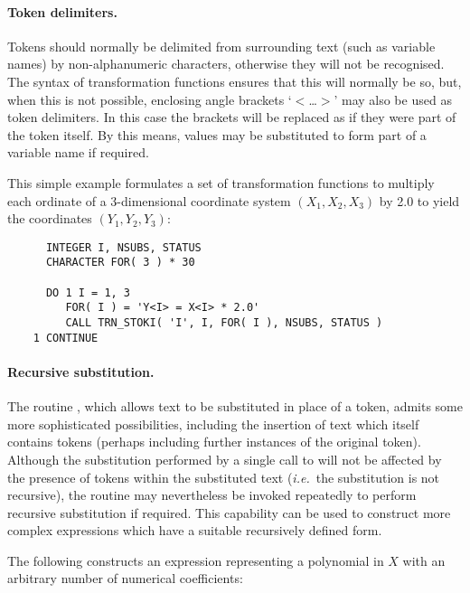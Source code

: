 \paragraph{Token delimiters.}
Tokens should normally be delimited from surrounding text (such as variable
names) by non-alphanumeric characters, otherwise they will not be 
recognised.
The syntax of transformation functions ensures that this will normally be 
so, but, when this is not possible, enclosing angle brackets `$<$\ldots $>$'
may also be used as token delimiters. 
In this case the brackets will be replaced as if they were part of the token
itself. 
By this means, values may be substituted to form part of a variable name if 
required.

This simple example formulates a set of transformation functions to multiply
each ordinate of a 3-dimensional coordinate system \mbox{$(X_1,X_2,X_3)$} by
2.0 to yield the coordinates \mbox{$(Y_1,Y_2,Y_3)$}: 

\begin{verbatim}
      INTEGER I, NSUBS, STATUS
      CHARACTER FOR( 3 ) * 30

      DO 1 I = 1, 3
         FOR( I ) = 'Y<I> = X<I> * 2.0'
         CALL TRN_STOKI( 'I', I, FOR( I ), NSUBS, STATUS )
    1 CONTINUE
\end{verbatim}
\exampledone

\paragraph{Recursive substitution.}
The routine , which allows text to be substituted in place
of a token, admits some more sophisticated possibilities, including the
insertion of text which itself contains tokens (perhaps including further
instances of the original token). 
Although the substitution performed by a single call to  
will not be affected by the presence of tokens within the substituted text 
({\em i.e.}\ the substitution is not recursive), the routine may nevertheless 
be invoked repeatedly to perform recursive substitution if required.
This capability can be used to construct more complex expressions which have
a suitable recursively defined form. 

The following constructs an expression representing a polynomial in $X$ with
an arbitrary number of numerical coefficients: 

